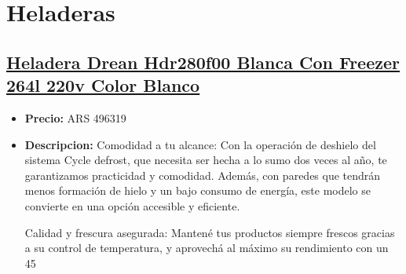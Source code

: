 \documentclass{article}
\begin{document}
    
    \section*{Heladeras}
    \setcounter{subsection}{0} %
    
    \begin{adjustwidth}{2em}{}

    \subsection{\underline{\href{https://www.mercadolibre.com.ar/heladera-drean-hdr280f00-blanca-con-freezer-264l-220v-color-blanco/p/MLA19879252}{Heladera Drean Hdr280f00 Blanca Con Freezer 264l 220v Color Blanco}}}
    \begin{itemize}
        \item \textbf{Precio:} ARS 496319
        \item \textbf{Descripcion:} Comodidad a tu alcance:
Con la operación de deshielo del sistema Cycle defrost, que necesita ser hecha a lo sumo dos veces al año, te garantizamos practicidad y comodidad. Además, con paredes que tendrán menos formación de hielo y un bajo consumo de energía, este modelo se convierte en una opción accesible y eficiente. 

Calidad y frescura asegurada:
Mantené tus productos siempre frescos gracias a su control de temperatura, y aprovechá al máximo su rendimiento con un 45%


\end{itemize}
\end{adjustwidth}
\end{document}
